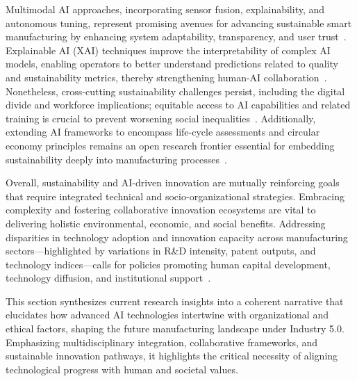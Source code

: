 \documentclass[sigconf]{acmart}
\begin{document}
Multimodal AI approaches, incorporating sensor fusion, explainability, and autonomous tuning, represent promising avenues for advancing sustainable smart manufacturing by enhancing system adaptability, transparency, and user trust~\cite{ref5,ref30}. Explainable AI (XAI) techniques improve the interpretability of complex AI models, enabling operators to better understand predictions related to quality and sustainability metrics, thereby strengthening human-AI collaboration~\cite{ref30}. Nonetheless, cross-cutting sustainability challenges persist, including the digital divide and workforce implications; equitable access to AI capabilities and related training is crucial to prevent worsening social inequalities~\cite{ref5}. Additionally, extending AI frameworks to encompass life-cycle assessments and circular economy principles remains an open research frontier essential for embedding sustainability deeply into manufacturing processes~\cite{ref38}.

Overall, sustainability and AI-driven innovation are mutually reinforcing goals that require integrated technical and socio-organizational strategies. Embracing complexity and fostering collaborative innovation ecosystems are vital to delivering holistic environmental, economic, and social benefits. Addressing disparities in technology adoption and innovation capacity across manufacturing sectors—highlighted by variations in R\&D intensity, patent outputs, and technology indices—calls for policies promoting human capital development, technology diffusion, and institutional support~\cite{ref21}.

This section synthesizes current research insights into a coherent narrative that elucidates how advanced AI technologies intertwine with organizational and ethical factors, shaping the future manufacturing landscape under Industry 5.0. Emphasizing multidisciplinary integration, collaborative frameworks, and sustainable innovation pathways, it highlights the critical necessity of aligning technological progress with human and societal values.
\end{document}
